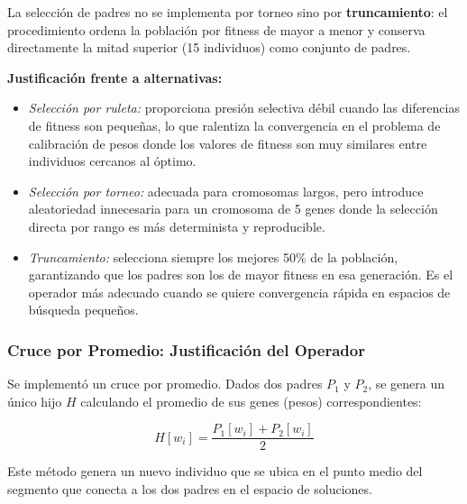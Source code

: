 \documentclass[11pt]{article}
\begin{document}
La selección de padres no se implementa por torneo sino por \textbf{truncamiento}: el procedimiento ordena la población por fitness de mayor a menor y conserva directamente la mitad superior (15 individuos) como conjunto de padres.

\textbf{Justificación frente a alternativas:}
\begin{itemize}
    \item \textit{Selección por ruleta:} proporciona presión selectiva débil cuando las diferencias de fitness son pequeñas, lo que ralentiza la convergencia en el problema de calibración de pesos donde los valores de fitness son muy similares entre individuos cercanos al óptimo.
    \item \textit{Selección por torneo:} adecuada para cromosomas largos, pero introduce aleatoriedad innecesaria para un cromosoma de 5 genes donde la selección directa por rango es más determinista y reproducible.
    \item \textit{Truncamiento:} selecciona siempre los mejores 50\% de la población, garantizando que los padres son los de mayor fitness en esa generación. Es el operador más adecuado cuando se quiere convergencia rápida en espacios de búsqueda pequeños.
\end{itemize}

\subsubsection{Cruce por Promedio: Justificación del Operador}

Se implementó un cruce por promedio. Dados dos padres $P_1$ y $P_2$, se genera un único hijo $H$ calculando el promedio de sus genes (pesos) correspondientes:

\begin{equation}
    H[w_i] = \frac{P_1[w_i] + P_2[w_i]}{2}
\end{equation}

Este método genera un nuevo individuo que se ubica en el punto medio del segmento que conecta a los dos padres en el espacio de soluciones.
\end{document}
